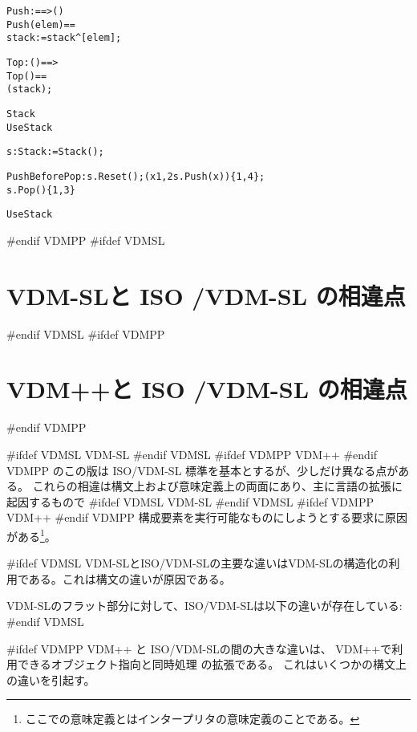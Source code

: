 \documentclass[\pformat,12pt]{jarticle}
\newcommand{\vdmslpp}[2]{%
#ifdef VDMSL
#1
#endif VDMSL
#ifdef VDMPP
#2
#endif VDMPP
}
\newcommand{\vdmsl}{VDM-SL}
\newcommand{\vdmpp}{VDM++}
\begin{document}
\begin{description}
\begin{alltt}
     Push:  ==> ()
    Push(elem) ==
      stack := stack ^ [elem];

     Top : () ==> 
    Top() ==
       ( stack);

 Stack
 UseStack


  s : Stack :=  Stack();


  PushBeforePop : s.Reset(); ( x  {1,2}  s.Push(x))\{1,4\}; 
                  s.Pop()\{1,3\}
 
 UseStack
\end{alltt}
\end{description}

#endif VDMPP
#ifdef VDMSL
\section{VDM-SLと ISO /VDM-SL の相違点}\label{diff}
#endif VDMSL
#ifdef VDMPP
\section{VDM++と ISO /VDM-SL の相違点}\label{diff}
#endif VDMPP

  \vdmslpp{\vdmsl}{\vdmpp} のこの版は ISO/VDM-SL 標準を基本とするが、少しだけ異なる点がある。
これらの相違は構文上および意味定義上の両面にあり、主に言語の拡張に起因するもので\vdmslpp{\vdmsl}{\vdmpp}構成要素を実行可能なものにしようとする要求に原因がある\footnote{ここでの意味定義とはインタープリタの意味定義のことである。}。

#ifdef VDMSL
{\vdmsl}とISO/VDM-SLの主要な違いはVDM-SLの構造化の利用である。これは構文の違いが原因である。

VDM-SLのフラット部分に対して、ISO/VDM-SLは以下の違いが存在している:
#endif VDMSL

#ifdef VDMPP
{\vdmpp} と ISO/VDM-SLの間の大きな違いは、 \vdmpp で利用できるオブジェクト指向と同時処理 %
の拡張である。
これはいくつかの構文上の違いを引起す。
\end{document}
